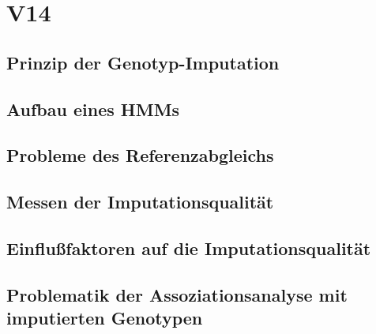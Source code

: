 \section{V14}
\subsection{Prinzip der Genotyp-Imputation}

\subsection{Aufbau eines HMMs}

\subsection{Probleme des Referenzabgleichs}

\subsection{Messen der Imputationsqualität}

\subsection{Einflußfaktoren auf die Imputationsqualität}

\subsection{Problematik der Assoziationsanalyse mit imputierten Genotypen}